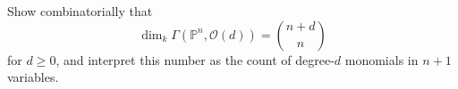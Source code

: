 \begin{problem}\label{chal:vi36-05}
Show combinatorially that
\[
\dim_k\Gamma(\mathbb P^n,\mathcal O(d))=\binom{n+d}{n}
\]
for \(d\ge0\), and interpret this number as the count of degree-\(d\) monomials in \(n+1\) variables.
\end{problem}
